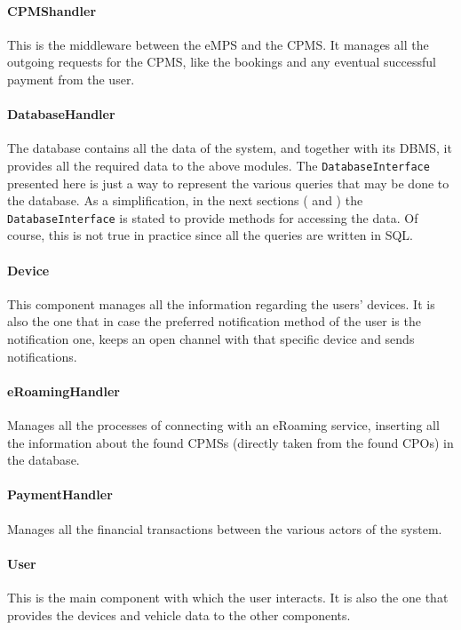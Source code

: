 \paragraph{CPMShandler} This is the middleware between the eMPS and the CPMS. It manages all the outgoing requests for the CPMS, like the bookings and any eventual successful payment from the user.

\paragraph{DatabaseHandler} The database contains all the data of the system, and together with its DBMS, it provides all the required data to the above modules. The \texttt{DatabaseInterface} presented here is just a way to represent the various queries that may be done to the database. As a simplification, in the next sections ( and ) the \texttt{DatabaseInterface} is stated to provide methods for accessing the data. Of course, this is not true in practice since all the queries are written in SQL.

\paragraph{Device} This component manages all the information regarding the users' devices. It is also the one that in case the preferred notification method of the user is the notification one, keeps an open channel with that specific device and sends notifications.

\paragraph{eRoamingHandler} Manages all the processes of connecting with an eRoaming service, inserting all the information about the found CPMSs (directly taken from the found CPOs) in the database.

\paragraph{PaymentHandler} Manages all the financial transactions between the various actors of the system.

\paragraph{User} This is the main component with which the user interacts. It is also the one that provides the devices and vehicle data to the other components.

